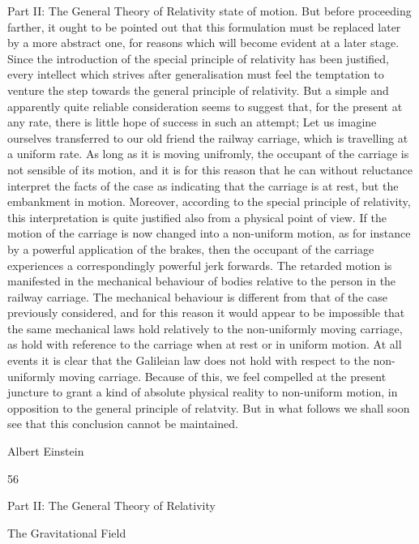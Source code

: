 \documentclass{article}
\begin{document}
Part II: The General Theory of Relativity
state of motion. But before proceeding farther, it ought to be pointed out that this
formulation must be replaced later by a more abstract one, for reasons which will become
evident at a later stage.
Since the introduction of the special principle of relativity has been justified, every
intellect which strives after generalisation must feel the temptation to venture the step
towards the general principle of relativity. But a simple and apparently quite reliable
consideration seems to suggest that, for the present at any rate, there is little hope of success
in such an attempt; Let us imagine ourselves transferred to our old friend the railway
carriage, which is travelling at a uniform rate. As long as it is moving unifromly, the
occupant of the carriage is not sensible of its motion, and it is for this reason that he can
without reluctance interpret the facts of the case as indicating that the carriage is at rest, but
the embankment in motion. Moreover, according to the special principle of relativity, this
interpretation is quite justified also from a physical point of view.
If the motion of the carriage is now changed into a non-uniform motion, as for instance
by a powerful application of the brakes, then the occupant of the carriage experiences a
correspondingly powerful jerk forwards. The retarded motion is manifested in the
mechanical behaviour of bodies relative to the person in the railway carriage. The
mechanical behaviour is different from that of the case previously considered, and for this
reason it would appear to be impossible that the same mechanical laws hold relatively to the
non-uniformly moving carriage, as hold with reference to the carriage when at rest or in
uniform motion. At all events it is clear that the Galileian law does not hold with respect to
the non-uniformly moving carriage. Because of this, we feel compelled at the present
juncture to grant a kind of absolute physical reality to non-uniform motion, in opposition to
the general principle of relatvity. But in what follows we shall soon see that this conclusion
cannot be maintained.

Albert Einstein

56

Part II: The General Theory of Relativity

The Gravitational Field
\end{document}
